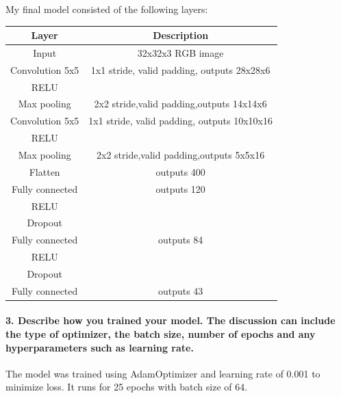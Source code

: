 \documentclass[11pt]{article}
\begin{document}
My final model consisted of the following layers:

\begin{longtable}[]{@{}cc@{}}
\toprule
Layer & Description\tabularnewline
\midrule
\endhead
Input & 32x32x3 RGB image\tabularnewline
Convolution 5x5 & 1x1 stride, valid padding, outputs
28x28x6\tabularnewline
RELU &\tabularnewline
Max pooling & 2x2 stride,valid padding,outputs 14x14x6\tabularnewline
Convolution 5x5 & 1x1 stride, valid padding, outputs
10x10x16\tabularnewline
RELU &\tabularnewline
Max pooling & 2x2 stride,valid padding,outputs 5x5x16\tabularnewline
Flatten & outputs 400\tabularnewline
Fully connected & outputs 120\tabularnewline
RELU &\tabularnewline
Dropout &\tabularnewline
Fully connected & outputs 84\tabularnewline
RELU &\tabularnewline
Dropout &\tabularnewline
Fully connected & outputs 43\tabularnewline
\bottomrule
\end{longtable}

\hypertarget{describe-how-you-trained-your-model.-the-discussion-can-include-the-type-of-optimizer-the-batch-size-number-of-epochs-and-any-hyperparameters-such-as-learning-rate.}{%
\paragraph{3. Describe how you trained your model. The discussion can
include the type of optimizer, the batch size, number of epochs and any
hyperparameters such as learning
rate.}\label{describe-how-you-trained-your-model.-the-discussion-can-include-the-type-of-optimizer-the-batch-size-number-of-epochs-and-any-hyperparameters-such-as-learning-rate.}}

The model was trained using AdamOptimizer and learning rate of 0.001 to
minimize loss. It runs for 25 epochs with batch size of 64.
\end{document}
